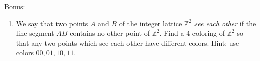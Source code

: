 \documentclass[a4paper]{article}
\newcommand{\ZZ}{\mathbb{Z}}
\begin{document}
Bonus:

\begin{enumerate}
\item We say that two points $A$ and $B$ of the integer lattice $\ZZ^2$ \emph{see each other} if the line segment $AB$ contains no other point of $\ZZ^2$. Find a $4$-coloring of $\ZZ^2$ so that any two points which see each other have different colors. Hint: use colors $00, 01, 10, 11$.
\end{enumerate}
\end{document}
